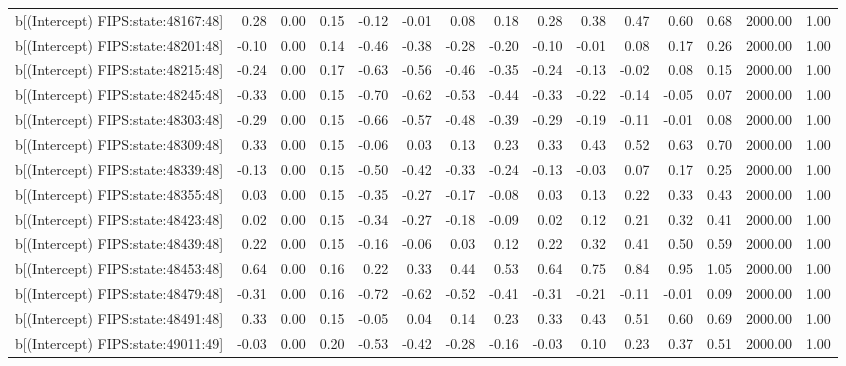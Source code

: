 \begin{table}[ht]
\begin{tabular}{rrrrrrrrrrrrrrr}
  b[(Intercept) FIPS:state:48167:48] & 0.28 & 0.00 & 0.15 & -0.12 & -0.01 & 0.08 & 0.18 & 0.28 & 0.38 & 0.47 & 0.60 & 0.68 & 2000.00 & 1.00 \\ 
  b[(Intercept) FIPS:state:48201:48] & -0.10 & 0.00 & 0.14 & -0.46 & -0.38 & -0.28 & -0.20 & -0.10 & -0.01 & 0.08 & 0.17 & 0.26 & 2000.00 & 1.00 \\ 
  b[(Intercept) FIPS:state:48215:48] & -0.24 & 0.00 & 0.17 & -0.63 & -0.56 & -0.46 & -0.35 & -0.24 & -0.13 & -0.02 & 0.08 & 0.15 & 2000.00 & 1.00 \\ 
  b[(Intercept) FIPS:state:48245:48] & -0.33 & 0.00 & 0.15 & -0.70 & -0.62 & -0.53 & -0.44 & -0.33 & -0.22 & -0.14 & -0.05 & 0.07 & 2000.00 & 1.00 \\ 
  b[(Intercept) FIPS:state:48303:48] & -0.29 & 0.00 & 0.15 & -0.66 & -0.57 & -0.48 & -0.39 & -0.29 & -0.19 & -0.11 & -0.01 & 0.08 & 2000.00 & 1.00 \\ 
  b[(Intercept) FIPS:state:48309:48] & 0.33 & 0.00 & 0.15 & -0.06 & 0.03 & 0.13 & 0.23 & 0.33 & 0.43 & 0.52 & 0.63 & 0.70 & 2000.00 & 1.00 \\ 
  b[(Intercept) FIPS:state:48339:48] & -0.13 & 0.00 & 0.15 & -0.50 & -0.42 & -0.33 & -0.24 & -0.13 & -0.03 & 0.07 & 0.17 & 0.25 & 2000.00 & 1.00 \\ 
  b[(Intercept) FIPS:state:48355:48] & 0.03 & 0.00 & 0.15 & -0.35 & -0.27 & -0.17 & -0.08 & 0.03 & 0.13 & 0.22 & 0.33 & 0.43 & 2000.00 & 1.00 \\ 
  b[(Intercept) FIPS:state:48423:48] & 0.02 & 0.00 & 0.15 & -0.34 & -0.27 & -0.18 & -0.09 & 0.02 & 0.12 & 0.21 & 0.32 & 0.41 & 2000.00 & 1.00 \\ 
  b[(Intercept) FIPS:state:48439:48] & 0.22 & 0.00 & 0.15 & -0.16 & -0.06 & 0.03 & 0.12 & 0.22 & 0.32 & 0.41 & 0.50 & 0.59 & 2000.00 & 1.00 \\ 
  b[(Intercept) FIPS:state:48453:48] & 0.64 & 0.00 & 0.16 & 0.22 & 0.33 & 0.44 & 0.53 & 0.64 & 0.75 & 0.84 & 0.95 & 1.05 & 2000.00 & 1.00 \\ 
  b[(Intercept) FIPS:state:48479:48] & -0.31 & 0.00 & 0.16 & -0.72 & -0.62 & -0.52 & -0.41 & -0.31 & -0.21 & -0.11 & -0.01 & 0.09 & 2000.00 & 1.00 \\ 
  b[(Intercept) FIPS:state:48491:48] & 0.33 & 0.00 & 0.15 & -0.05 & 0.04 & 0.14 & 0.23 & 0.33 & 0.43 & 0.51 & 0.60 & 0.69 & 2000.00 & 1.00 \\ 
  b[(Intercept) FIPS:state:49011:49] & -0.03 & 0.00 & 0.20 & -0.53 & -0.42 & -0.28 & -0.16 & -0.03 & 0.10 & 0.23 & 0.37 & 0.51 & 2000.00 & 1.00 \\ 

\end{tabular}
\end{table}
